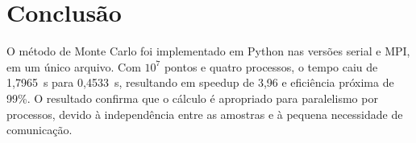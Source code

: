 \section{Conclusão}

O método de Monte Carlo foi implementado em Python nas versões serial e MPI,
em um único arquivo. Com $10^7$ pontos e quatro processos, o tempo caiu de
1,7965~s para 0,4533~s, resultando em speedup de 3,96 e eficiência próxima de
99\%. O resultado confirma que o cálculo é apropriado para paralelismo por
processos, devido à independência entre as amostras e à pequena necessidade de
comunicação.
